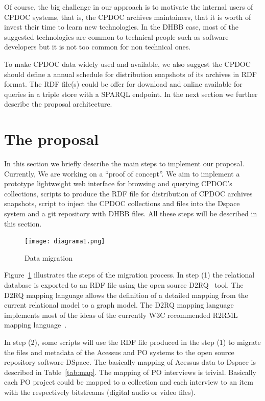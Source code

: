 \documentclass{llncs}
\begin{document}
Of course, the big challenge in our approach is to motivate the
internal users of CPDOC systems, that is, the CPDOC archives
maintainers, that it is worth of invest their time to learn new
technologies. In the DHBB case, most of the suggested technologies are
common to technical people such as software developers but it is not
too common for non technical ones.

To make CPDOC data widely used and available, we also suggest the
CPDOC should define a annual schedule for distribution snapshots of
its archives in RDF format. The RDF file(s) could be offer for
download and online available for queries in a triple store with a
SPARQL endpoint. In the next section we further describe the proposal
architecture.


\section{The proposal}

In this section we briefly describe the main steps to implement our
proposal. Currently, We are working on a ``proof of concept''. We aim
to implement a prototype lightweight web interface for browsing and
querying CPDOC's collections, scripts to produce the RDF file for
distribution of CPDOC archives snapshots, script to inject the CPDOC
collections and files into the Dspace system and a git repository with
DHBB files. All these steps will be described in this section.

\begin{figure}[thbp]
  \centering
  \texttt{[image: diagrama1.png]}
  \caption{Data migration}\label{fig:dia-1}
\end{figure}

Figure~\ref{fig:dia-1} illustrates the steps of the migration
process. In step (1) the relational database is exported to an RDF
file using the open source D2RQ~\cite{d2rq} tool. The D2RQ mapping
language allows the definition of a detailed mapping from the current
relational model to a graph model. The D2RQ mapping
language~\cite{d2rq-map} implements most of the ideas of the currently
W3C recommended R2RML mapping language~\cite{r2rml}.

In step (2), some scripts will use the RDF file produced in the step
(1) to migrate the files and metadata of the Acessus and PO systems
to the open source repository software DSpace. The basically mapping of
Acessus data to Dspace is described in Table~\ref{tab:map}. The
mapping of PO interviews is trivial. Basically each PO project could
be mapped to a collection and each interview to an item with the
respectively bitstreams (digital audio or video files).
\end{document}
